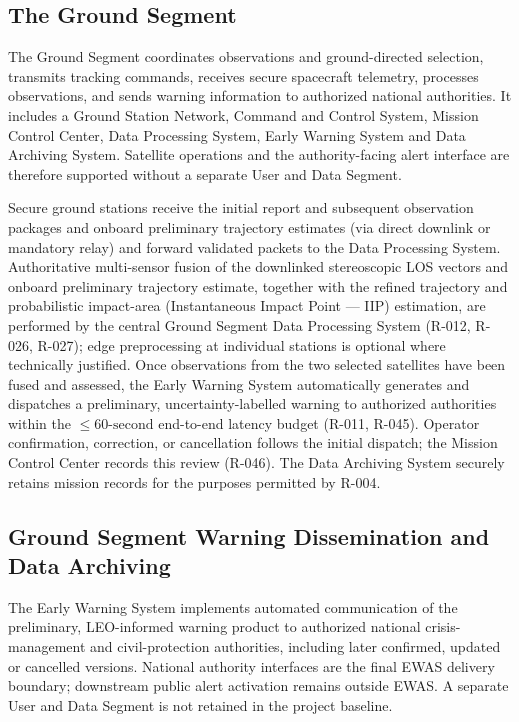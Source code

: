 \subsection{The Ground Segment} 
The Ground Segment coordinates observations and ground-directed  selection, transmits tracking commands, receives secure spacecraft telemetry, processes observations, and sends warning information to authorized national authorities. It includes a Ground Station Network, Command and Control System, Mission Control Center, Data Processing System, Early Warning System and Data Archiving System. Satellite operations and the authority-facing alert interface are therefore supported without a separate User and Data Segment. 

Secure ground stations receive the initial  report and subsequent  observation packages and onboard preliminary trajectory estimates (via direct downlink or mandatory  relay) and forward validated packets to the Data Processing System. Authoritative multi-sensor fusion of the downlinked stereoscopic LOS vectors and onboard preliminary trajectory estimate, together with the refined trajectory and probabilistic impact-area (Instantaneous Impact Point --- IIP) estimation, are performed by the central Ground Segment Data Processing System (R-012, R-026, R-027); edge preprocessing at individual stations is optional where technically justified. Once observations from the two selected  satellites have been fused and assessed, the Early Warning System automatically generates and dispatches a preliminary, uncertainty-labelled warning to authorized authorities within the $\le 60\text{-second}$ end-to-end latency budget (R-011, R-045). Operator confirmation, correction, or cancellation follows the initial dispatch; the Mission Control Center records this review (R-046). The Data Archiving System securely retains mission records for the purposes permitted by R-004. 


\subsection{Ground Segment Warning Dissemination and Data Archiving}
The Early Warning System implements automated communication of the preliminary, LEO-informed warning product to authorized national crisis-management and civil-protection authorities, including later confirmed, updated or cancelled versions. National authority interfaces are the final EWAS delivery boundary; downstream public alert activation remains outside EWAS. A separate User and Data Segment is not retained in the project baseline.

